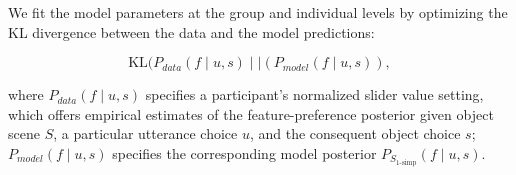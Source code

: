 \documentclass[10pt,a4paper]{article}
\begin{document}
We fit the model parameters at the group and individual levels by optimizing the KL divergence between the data and the model predictions:

\begin{equation}
\textrm{KL}(P_{data}(f \mid u,s)\mid\mid (P_{model}(f\mid u,s)),
\end{equation}

\noindent where $P_{data}(f\mid u,s)$ specifies a participant's normalized slider value setting, which offers empirical estimates of the feature-preference posterior given object scene $S$, a particular utterance choice $u$, and the consequent object choice $s$;
$P_{model}(f\mid u,s)$ specifies the corresponding model posterior $P_{S_{1\textrm{-simp}}}(f\mid u,s)$. 

\end{document}
